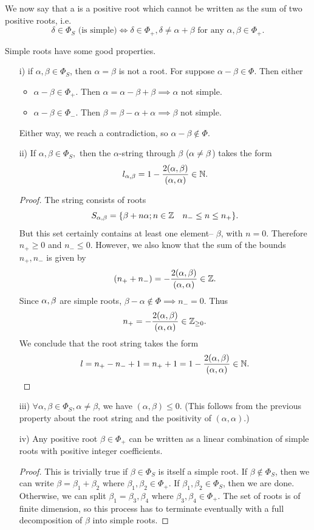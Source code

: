 \begin{defn}
We now say that a  is a positive root which cannot be written as the sum of two positive roots, i.e.
$$\delta \in \Phi_S \text{ (is simple)} \iff \delta \in \Phi_+, \delta \neq \alpha+\beta \text{ for any } \alpha,\beta \in \Phi_+.$$
\end{defn}
Simple roots have some good properties.
\begin{enumerate}
    \item[i)] if $\alpha,\beta\in \Phi_S$, then $\alpha=\beta$ is not a root. For suppose $\alpha-\beta\in \Phi$. Then either
    \begin{itemize}
        \item $\alpha-\beta \in \Phi_+$. Then $\alpha=\alpha-\beta+\beta \implies \alpha$ not simple.
        \item $\alpha-\beta \in\Phi_-$. Then $\beta=\beta-\alpha+\alpha \implies \beta$ not simple.
    \end{itemize}
    Either way, we reach a contradiction, so $\alpha-\beta\notin \Phi.$
    \item[ii)] If $\alpha,\beta \in \Phi_S,$ then the $\alpha$-string through $\beta$ ($\alpha\neq \beta$) takes the form
    $$l_{\alpha,\beta}=1-\frac{2(\alpha,\beta)}{(\alpha,\alpha)}\in \mathbb{N}.$$
    \begin{proof} The string consists of roots
    $$S_{\alpha,\beta}=\{\beta+n\alpha;n\in \mathbb{Z}\quad n_- \leq n \leq n_+\}.$$
    But this set certainly contains at least one element-- $\beta$, with $n=0$. Therefore $n_+\geq 0$ and $n_-\leq 0$. However, we also know that the sum of the bounds $n_+,n_-$ is given by 
    $$(n_++n_-)=-\frac{2(\alpha,\beta)}{(\alpha,\alpha)}\in \mathbb{Z}.$$
    Since $\alpha,\beta$ are simple roots, $\beta-\alpha \notin \Phi \implies n_- =0$. Thus
    $$n_+ = -\frac{2(\alpha,\beta)}{(\alpha,\alpha)}\in \mathbb{Z}_{\geq 0}.$$
    We conclude that the root string takes the form
    $$l=n_+ - n_- + 1 = n_+ +1 = 1-\frac{2(\alpha,\beta)}{(\alpha,\alpha)} \in \mathbb{N}.$$
    \end{proof}
    \item[iii)] $\forall \alpha,\beta \in \Phi_S, \alpha \neq \beta$, we have $(\alpha,\beta)\leq 0$. (This follows from the previous property about the root string and the positivity of $(\alpha,\alpha)$.)
    \item[iv)] Any positive root $\beta\in \Phi_+$ can be written as a linear combination of simple roots with positive integer coefficients.
    \begin{proof}
    This is trivially true if $\beta\in \Phi_S$ is itself a simple root. If $\beta\notin \Phi_S$, then we can write $\beta=\beta_1+\beta_2$ where $\beta_1,\beta_2 \in \Phi_+.$ If $\beta_1,\beta_2\in \Phi_S$, then we are done. Otherwise, we can split $\beta_1=\beta_3,\beta_4$ where $\beta_3,\beta_4\in \Phi_+$. The set of roots is of finite dimension, so this process has to terminate eventually with a full decomposition of $\beta$ into simple roots.

\end{proof}
\end{enumerate}
